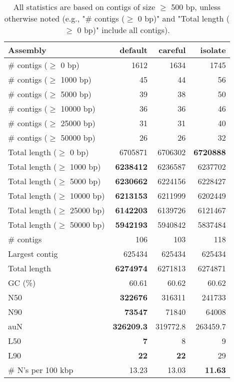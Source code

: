 \documentclass[12pt,a4paper]{article}
\begin{document}
\begin{table}[ht]
\begin{center}
\caption{All statistics are based on contigs of size $\geq$ 500 bp, unless otherwise noted (e.g., "\# contigs ($\geq$ 0 bp)" and "Total length ($\geq$ 0 bp)" include all contigs).}
\begin{tabular}{|l*{3}{|r}|}
\hline
Assembly & default & careful & isolate \\ \hline
\# contigs ($\geq$ 0 bp) & 1612 & 1634 & 1745 \\ \hline
\# contigs ($\geq$ 1000 bp) & 45 & 44 & 56 \\ \hline
\# contigs ($\geq$ 5000 bp) & 39 & 38 & 50 \\ \hline
\# contigs ($\geq$ 10000 bp) & 36 & 36 & 46 \\ \hline
\# contigs ($\geq$ 25000 bp) & 31 & 31 & 40 \\ \hline
\# contigs ($\geq$ 50000 bp) & 26 & 26 & 32 \\ \hline
Total length ($\geq$ 0 bp) & 6705871 & 6706302 & {\bf 6720888} \\ \hline
Total length ($\geq$ 1000 bp) & {\bf 6238412} & 6236587 & 6237702 \\ \hline
Total length ($\geq$ 5000 bp) & {\bf 6230662} & 6224156 & 6228427 \\ \hline
Total length ($\geq$ 10000 bp) & {\bf 6213153} & 6211999 & 6202449 \\ \hline
Total length ($\geq$ 25000 bp) & {\bf 6142203} & 6139726 & 6121467 \\ \hline
Total length ($\geq$ 50000 bp) & {\bf 5942193} & 5940842 & 5837484 \\ \hline
\# contigs & 106 & 103 & 118 \\ \hline
Largest contig & 625434 & 625434 & 625434 \\ \hline
Total length & {\bf 6274974} & 6271813 & 6274871 \\ \hline
GC (\%) & 60.61 & 60.62 & 60.62 \\ \hline
N50 & {\bf 322676} & 316311 & 241733 \\ \hline
N90 & {\bf 73547} & 71840 & 64008 \\ \hline
auN & {\bf 326209.3} & 319772.8 & 263459.7 \\ \hline
L50 & {\bf 7} & 8 & 9 \\ \hline
L90 & {\bf 22} & {\bf 22} & 29 \\ \hline
\# N's per 100 kbp & 13.23 & 13.03 & {\bf 11.63} \\ \hline
\end{tabular}
\end{center}
\end{table}
\end{document}
